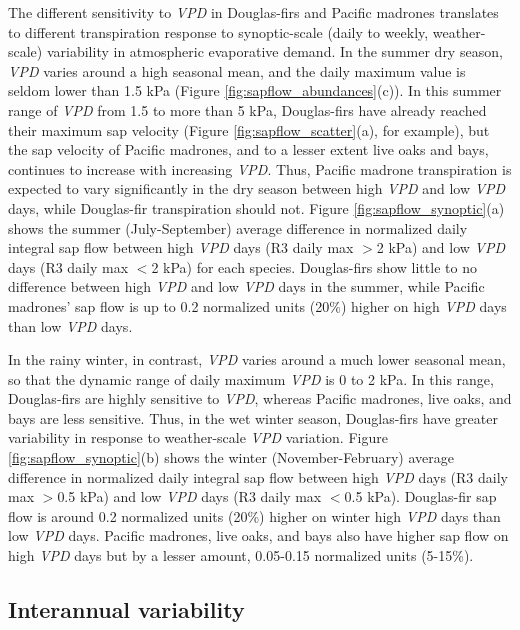 The different sensitivity to \textit{VPD} in Douglas-firs and Pacific madrones translates to different transpiration response to synoptic-scale (daily to weekly, weather-scale) variability in atmospheric evaporative demand.  In the summer dry season, \textit{VPD} varies around a high seasonal mean, and the daily maximum value is seldom lower than 1.5 kPa (Figure \ref{fig:sapflow_abundances}(c)).  In this summer range of \textit{VPD} from 1.5 to more than 5 kPa, Douglas-firs have already reached their maximum sap velocity (Figure \ref{fig:sapflow_scatter}(a), for example), but the sap velocity of Pacific madrones, and to a lesser extent live oaks and bays, continues to increase with increasing \textit{VPD}.  Thus, Pacific madrone transpiration is expected to vary significantly in the dry season between high \textit{VPD} and low \textit{VPD} days, while Douglas-fir transpiration should not.  Figure \ref{fig:sapflow_synoptic}(a) shows the summer (July-September) average difference in normalized daily integral sap flow between high \textit{VPD} days (R3 daily max $>$2 kPa) and low \textit{VPD} days (R3 daily max $<$2 kPa) for each species.  Douglas-firs show little to no difference between high \textit{VPD} and low \textit{VPD} days in the summer, while Pacific madrones' sap flow is up to 0.2 normalized units (20\%) higher on high \textit{VPD} days than low \textit{VPD} days.

In the rainy winter, in contrast, \textit{VPD} varies around a much lower seasonal mean, so that the dynamic range of daily maximum \textit{VPD} is 0 to 2 kPa.  In this range, Douglas-firs are highly sensitive to \textit{VPD}, whereas Pacific madrones, live oaks, and bays are less sensitive.  Thus, in the wet winter season, Douglas-firs have greater variability in response to weather-scale \textit{VPD} variation.  Figure \ref{fig:sapflow_synoptic}(b) shows the winter (November-February) average difference in normalized daily integral sap flow between high \textit{VPD} days (R3 daily max $>$0.5 kPa) and low \textit{VPD} days (R3 daily max $<$0.5 kPa).  Douglas-fir sap flow is around 0.2 normalized units (20\%) higher on winter high \textit{VPD} days than low \textit{VPD} days.  Pacific madrones, live oaks, and bays also have higher sap flow on high \textit{VPD} days but by a lesser amount, 0.05-0.15 normalized units (5-15\%).

\subsection{Interannual variability}

